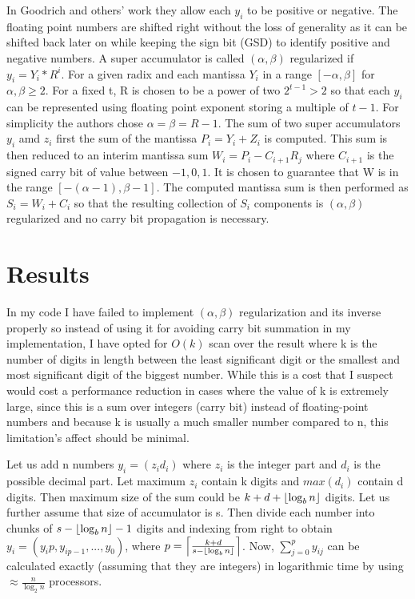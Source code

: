 \documentclass[11pt]{article}       %
\DeclarePairedDelimiter{\ceil}{\lceil}{\rceil}
\DeclarePairedDelimiter{\floor}{\lfloor}{\rfloor}
\begin{document}
In Goodrich and others' work they allow each $y_i$ to be positive or negative. The floating point numbers are shifted right without the loss of generality as it can be shifted back later on while keeping the sign bit (GSD) to identify positive and negative numbers. A super accumulator is called $(\alpha,\beta)$ regularized if $y_i = Y_i * R^i$. For a given radix and each mantissa $Y_i$ in a range $[-\alpha, \beta]$ for $\alpha, \beta \geq 2$. For a fixed t, R is chosen to be a power of two $2^{t-1} > 2$ so that each $y_i$ can be represented using floating point exponent storing a multiple of $t-1$. For simplicity the authors chose $\alpha = \beta = R-1$. The sum of two super accumulators $y_i$ amd $z_i$ first the sum of the mantissa $P_i = Y_i + Z_i$ is computed. This sum is then reduced to an interim mantissa sum $W_i = P_i - C_{i+1}R_j$ where $C_{i+1}$ is the signed carry bit of value between ${-1,0,1}$. It is chosen to guarantee that W is in the range $[-(\alpha-1), \beta-1]$. The computed mantissa sum is then performed as $S_i = W_i + C_i$ so that the resulting collection of $S_i$ components is $(\alpha,\beta)$ regularized and no carry bit propagation is necessary.

\section{Results} \label{results}

In my code I have failed to implement $(\alpha, \beta)$ regularization and its inverse properly so instead of using it for avoiding carry bit summation in my implementation, I have opted for $O(k)$ scan over the result where k is the number of digits in length between the least significant digit or the smallest and most significant digit of the biggest number. While this is a cost that I suspect would cost a performance reduction in cases where the value of k is extremely large, since this is a sum over integers (carry bit) instead of floating-point numbers and because k is usually a much smaller number compared to n, this limitation's affect should be minimal.


Let us add n numbers $y_i = (z_i d_i)$ where $z_i$ is the integer part and $d_i$ is the possible decimal part. Let maximum ${z_i}$ contain k digits and $max(d_i)$ contain d digits. Then maximum size of the sum could be $k + d + \floor*{\log_b {n}}$ digits. Let us further assume that size of accumulator is s. Then divide each number into chunks of $s - \floor*{\log_b {n}} - 1$ digits and indexing from right to obtain $y_i =(y_ip, y_{ip-1},..., y_0)$, where $p=\ceil*{\frac{k+d}{s- \floor*{\log_b {n}}}}$. Now, $\sum\limits_{j=0}^{p}y_{ij}$ can be calculated exactly (assuming that they are integers) in logarithmic time by using $\approx \frac{n}{\log_2 {n}}$ processors.  
\end{document}
